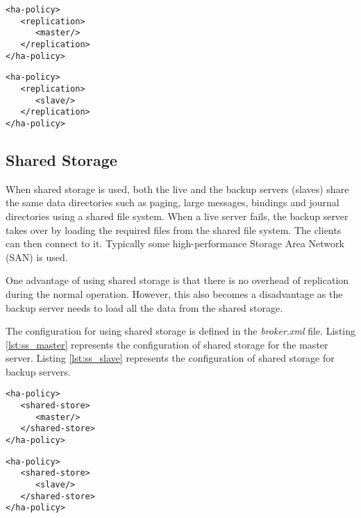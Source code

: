 \bigskip
\noindent\begin{minipage}{.45\columnwidth}
\begin{lstlisting}[style=XmlInputStyle,caption=HA replication master, label={lst:dr_master}]
<ha-policy>
   <replication>
      <master/>
   </replication>
</ha-policy>
\end{lstlisting}
\end{minipage}\hfill
\begin{minipage}{.45\columnwidth}
\begin{lstlisting}[style=XmlInputStyle,caption=HA replication slave, label={lst:dr_slave}]
<ha-policy>
   <replication>
      <slave/>
   </replication>
</ha-policy>
\end{lstlisting}
\end{minipage}

\subsection{Shared Storage}

When shared storage is used, both the live and the backup servers (slaves) share the same data directories such as paging, large messages, bindings and journal directories using a shared file system. When a live server fails, the backup server takes over by loading the required files from the shared file system. The clients can then connect to it. Typically some high-performance Storage Area Network (SAN) is used.

One advantage of using shared storage is that there is no overhead of replication during the normal operation. However, this also becomes a disadvantage as the backup server needs to load all the data from the shared storage.

The configuration for using shared storage is defined in the \textit{broker.xml} file. Listing \ref{lst:ss_master} represents the configuration of shared storage for the master server. Listing \ref{lst:ss_slave} represents the configuration of shared storage for backup servers.

\bigskip
\noindent\begin{minipage}{.45\columnwidth}
\begin{lstlisting}[style=XmlInputStyle,caption=HA Shared storage master, label={lst:ss_master}]
<ha-policy>
   <shared-store>
      <master/>
   </shared-store>
</ha-policy>
\end{lstlisting}
\end{minipage}\hfill
\begin{minipage}{.45\columnwidth}
\begin{lstlisting}[style=XmlInputStyle,caption=HA Shared storage slave, label={lst:ss_slave}]
<ha-policy>
   <shared-store>
      <slave/>
   </shared-store>
</ha-policy>
\end{lstlisting}
\end{minipage}
